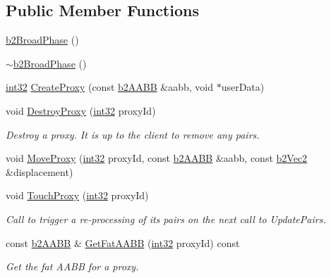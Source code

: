 \subsection*{Public Member Functions}
\begin{DoxyCompactItemize}
\item 
\mbox{\hyperlink{classb2_broad_phase_ac58820d4cb10df81a33923c7c75d8f85}{b2\+Broad\+Phase}} ()
\item 
\mbox{\hyperlink{classb2_broad_phase_a40cebf62f00ebfa7ca373ad96f76661f}{$\sim$b2\+Broad\+Phase}} ()
\item 
\mbox{\hyperlink{b2_settings_8h_a43d43196463bde49cb067f5c20ab8481}{int32}} \mbox{\hyperlink{classb2_broad_phase_ae2f7af756bc55ece45221466c5af449c}{Create\+Proxy}} (const \mbox{\hyperlink{structb2_a_a_b_b}{b2\+A\+A\+BB}} \&aabb, void $\ast$user\+Data)
\item 
void \mbox{\hyperlink{classb2_broad_phase_a84f0fb227dc01a9b9baa55c7b8c68984}{Destroy\+Proxy}} (\mbox{\hyperlink{b2_settings_8h_a43d43196463bde49cb067f5c20ab8481}{int32}} proxy\+Id)
\begin{DoxyCompactList}\small\item\em Destroy a proxy. It is up to the client to remove any pairs. \end{DoxyCompactList}\item 
void \mbox{\hyperlink{classb2_broad_phase_a01dc18a19c2b5d0cc1d9cd8c8554234c}{Move\+Proxy}} (\mbox{\hyperlink{b2_settings_8h_a43d43196463bde49cb067f5c20ab8481}{int32}} proxy\+Id, const \mbox{\hyperlink{structb2_a_a_b_b}{b2\+A\+A\+BB}} \&aabb, const \mbox{\hyperlink{structb2_vec2}{b2\+Vec2}} \&displacement)
\item 
void \mbox{\hyperlink{classb2_broad_phase_a67b296431ebbc7b44037f21d645d9166}{Touch\+Proxy}} (\mbox{\hyperlink{b2_settings_8h_a43d43196463bde49cb067f5c20ab8481}{int32}} proxy\+Id)
\begin{DoxyCompactList}\small\item\em Call to trigger a re-\/processing of it\textquotesingle{}s pairs on the next call to Update\+Pairs. \end{DoxyCompactList}\item 
const \mbox{\hyperlink{structb2_a_a_b_b}{b2\+A\+A\+BB}} \& \mbox{\hyperlink{classb2_broad_phase_af5c47c036ca67d44676ea3cec73ae3d8}{Get\+Fat\+A\+A\+BB}} (\mbox{\hyperlink{b2_settings_8h_a43d43196463bde49cb067f5c20ab8481}{int32}} proxy\+Id) const
\begin{DoxyCompactList}\small\item\em Get the fat A\+A\+BB for a proxy. \end{DoxyCompactList}\item 

\end{DoxyCompactItemize}
